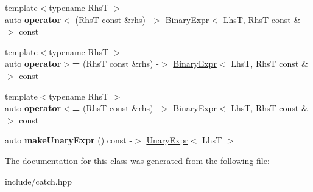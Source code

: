 \begin{DoxyCompactItemize}
\item 
{\footnotesize template$<$typename RhsT $>$ }\\auto {\bfseries operator$<$} (RhsT const \&rhs) -\/$>$ \hyperlink{classCatch_1_1BinaryExpr}{Binary\+Expr}$<$ LhsT, RhsT const \& $>$ const \hypertarget{classCatch_1_1ExprLhs_a1ae37b86c3156b5fbcaaf02726489f85}{}\label{classCatch_1_1ExprLhs_a1ae37b86c3156b5fbcaaf02726489f85}

\item 
{\footnotesize template$<$typename RhsT $>$ }\\auto {\bfseries operator$>$=} (RhsT const \&rhs) -\/$>$ \hyperlink{classCatch_1_1BinaryExpr}{Binary\+Expr}$<$ LhsT, RhsT const \& $>$ const \hypertarget{classCatch_1_1ExprLhs_af367c2fe8f97d6f103988627843ad613}{}\label{classCatch_1_1ExprLhs_af367c2fe8f97d6f103988627843ad613}

\item 
{\footnotesize template$<$typename RhsT $>$ }\\auto {\bfseries operator$<$=} (RhsT const \&rhs) -\/$>$ \hyperlink{classCatch_1_1BinaryExpr}{Binary\+Expr}$<$ LhsT, RhsT const \& $>$ const \hypertarget{classCatch_1_1ExprLhs_a9a5551293bfe9440ef190cb2b20bc0f8}{}\label{classCatch_1_1ExprLhs_a9a5551293bfe9440ef190cb2b20bc0f8}

\item 
auto {\bfseries make\+Unary\+Expr} () const -\/$>$ \hyperlink{classCatch_1_1UnaryExpr}{Unary\+Expr}$<$ LhsT $>$\hypertarget{classCatch_1_1ExprLhs_ab68bd6d5d3ae21b7fba9010150fba95d}{}\label{classCatch_1_1ExprLhs_ab68bd6d5d3ae21b7fba9010150fba95d}

\end{DoxyCompactItemize}


The documentation for this class was generated from the following file\+:\begin{DoxyCompactItemize}
\item 
include/catch.\+hpp\end{DoxyCompactItemize}
